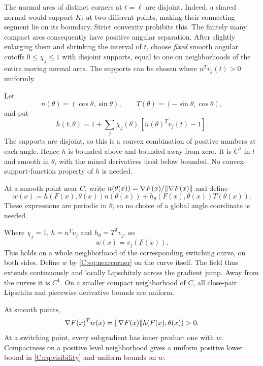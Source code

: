 The normal arcs of distinct corners at $t=\ell$ are disjoint. Indeed, a shared normal would support $K_\ell$ at two different points, making their connecting segment lie on its boundary. Strict convexity prohibits this. The finitely many compact arcs consequently have positive angular separation. After slightly enlarging them and shrinking the interval of $t$, choose \emph{fixed} smooth angular cutoffs $0\le\chi_j\le1$ with disjoint supports, equal to one on neighborhoods of the entire moving normal arcs. The supports can be chosen where $n^Tv_j(t)>0$ uniformly.

Let
\[
 n(\theta)=(\cos\theta,\sin\theta),\qquad
 T(\theta)=(-\sin\theta,\cos\theta),
\]
and put
\begin{equation}\label{C:eq:h}
 h(t,\theta)=1+\sum_j\chi_j(\theta)\,[n(\theta)^Tv_j(t)-1].
\end{equation}
The supports are disjoint, so this is a convex combination of positive numbers at each angle. Hence $h$ is bounded above and bounded away from zero. It is $C^1$ in $t$ and smooth in $\theta$, with the mixed derivatives used below bounded. No convex-support-function property of $h$ is needed.

At a smooth point near $C$, write $n(\theta(x))=\nabla F(x)/\lVert \nabla F(x)\rVert$ and define
\begin{equation}\label{C:eq:w}
 w(x)=h(F(x),\theta(x))n(\theta(x))
       +h_\theta(F(x),\theta(x))T(\theta(x)).
\end{equation}
These expressions are periodic in $\theta$, so no choice of a global angle coordinate is needed.

Where $\chi_j=1$, $h=n^Tv_j$ and $h_\theta=T^Tv_j$, so
\begin{equation}\label{C:eq:nearcorner}
 w(x)=v_j(F(x)).
\end{equation}
This holds on a whole neighborhood of the corresponding switching curve, on both sides. Define $w$ by \eqref{C:eq:nearcorner} on the curve itself. The field thus extends continuously and locally Lipschitzly across the gradient jump. Away from the curves it is $C^1$. On a smaller compact neighborhood of $C$, all close-pair Lipschitz and piecewise derivative bounds are uniform.

At smooth points,
\begin{equation}\label{C:eq:visibility}
 \nabla F(x)^Tw(x)=\lVert \nabla F(x)\rVert h(F(x),\theta(x))>0.
\end{equation}
At a switching point, every subgradient has inner product one with $w$. Compactness on a positive level neighborhood gives a uniform positive lower bound in \eqref{C:eq:visibility} and uniform bounds on $w$.

